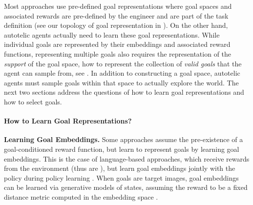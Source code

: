 

Most \rlemgep approaches use pre-defined goal representations where goal spaces and associated rewards are pre-defined by the engineer and are part of the task definition (see our topology of goal representation in ). On the other hand, autotelic agents actually need to learn these goal representations. While individual goals are represented by their embeddings and associated reward functions, representing multiple goals also requires the representation of the \textit{support} of the goal space, \ie how to represent the collection of \textit{valid goals} that the agent can sample from, see . In addition to constructing a goal space, autotelic agents must sample goals within that space to actually explore the world. The next two sections address the questions of how to learn goal representations and how to select goals. 

\paragraph{How to Learn Goal Representations?}

\noindent\textbf{Learning Goal Embeddings.} Some approaches assume the pre-existence of a goal-conditioned reward function, but learn to represent goals by learning goal embeddings. This is the case of language-based approaches, which receive rewards from the environment (thus are \rlemgep), but learn goal embeddings jointly with the policy during policy learning \citep{Hermann2017,chan2019actrce,Jiang2019,bahdanau2018systematic,hill2019emergent,ther,lynch2020grounding}. When goals are target images, goal embeddings can be learned via generative models of states, assuming the reward to be a fixed distance metric computed in the embedding space \citep{nair2018visual,florensa2019selfsupervised,pong2019skew,nair2020contextual}.

